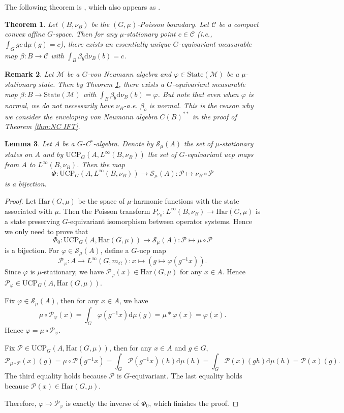 \documentclass[12pt]{amsart}
\newcommand{\cC}{{\mathcal C}}
\newcommand{\cM}{{\mathcal M}}
\newcommand{\cP}{{\mathcal P}}
\def\d{\mathrm{d}}
\newtheorem{thm}{Theorem}[section]
\newtheorem{lemma}[thm]{Lemma}
\newtheorem{remark}[thm]{Remark}
\theoremstyle{definition}
\begin{document}
The following theorem is \cite[Theorem 2.16]{BS06}, which also appears as \cite[Theorem 2.5]{boutonnet2021stationary}.
\begin{thm}\label{thm:boundary map}
Let $(B,\nu_B)$ be the $(G,\mu)$-Poisson boundary. Let $\cC$ be a compact convex affine $G$-space. Then for any $\mu$-stationary point $c\in\cC$ (i.e., $\int_G gc\,\d\mu(g)=c$), there exists an essentially unique $G$-equivariant measurable map $\beta:B\to \cC$ with $\int_B\beta_b\d\nu_B(b)=c$.
\end{thm}

\begin{remark}
Let $\cM$ be a $G$-von Neumann algebra and $\varphi\in \mathrm{State}(\cM)$ be a $\mu$-stationary state. Then by Theorem \ref{thm:boundary map}, there exists a $G$-equivariant measurable map $\beta:B\to \mathrm{State}(\cM)$ with $\int_B\beta_b\d\nu_B(b)=\varphi$. But note that even when $\varphi$ is normal, we do not necessarily have $\nu_B$-a.e. $\beta_b$ is normal. This is the reason why we consider the enveloping von Neumann algebra $C(B)^{**}$ in the proof of Theorem \ref{thm:NC IFT}.
\end{remark}

\begin{lemma}\label{lem:bijection stationary states and ucp maps}
Let $A$ be a $G$-C$^*$-algebra. Denote by $\mathcal{S}_\mu(A)$ the set of $\mu$-stationary states on $A$ and by $\mathrm{UCP}_G(A,L^\infty(B,\nu_B))$ the set of $G$-equivariant ucp maps from $A$ to $L^\infty(B,\nu_B)$. Then the map
$$\Phi:\mathrm{UCP}_G(A,L^\infty(B,\nu_B))\to\mathcal{S}_\mu(A):\cP\mapsto\nu_B\circ\cP$$
is a bijection.
\end{lemma}
\begin{proof}
Let $\mathrm{Har}(G,\mu)$ be the space of $\mu$-harmonic functions with the state associated with $\mu$. Then the Poisson transform $P_{\nu_B}:L^\infty(B,\nu_B)\to \mathrm{Har}(G,\mu)$ is a state preserving $G$-equivariant isomorphism between operator systems. Hence we only need to prove that
$$\Phi_0:\mathrm{UCP}_G(A,\mathrm{Har}(G,\mu))\to\mathcal{S}_\mu(A):\cP\mapsto\mu\circ\cP$$
is a bijection. For $\varphi\in\mathcal{S}_\mu(A)$, define a $G$-ucp map 
$$\cP_\varphi:A\to L^\infty(G,m_G):x\mapsto(g\mapsto \varphi(g^{-1}x)).$$
Since $\varphi$ is $\mu$-stationary, we have $\cP_\varphi(x)\in \mathrm{Har}(G,\mu)$ for any $x\in A$. Hence $\cP_\varphi\in\mathrm{UCP}_G(A,\mathrm{Har}(G,\mu))$. 

Fix $\varphi\in\mathcal{S}_\mu(A)$, then for any $x\in A$, we have
$$\mu\circ\cP_\varphi(x)=\int_G \varphi(g^{-1}x)\d\mu(g)=\mu\ast\varphi(x)=\varphi(x).$$
Hence $\varphi=\mu\circ\cP_\varphi$.

Fix $\cP\in\mathrm{UCP}_G(A,\mathrm{Har}(G,\mu))$, then for any $x\in A$ and $g\in G$,
$$\cP_{\mu\circ\cP}(x)(g)=\mu\circ\cP(g^{-1}x)=\int_G \cP(g^{-1}x)(h)\d\mu(h)=\int_G \cP(x)(gh)\d\mu(h)=\cP(x)(g).$$
The third equality holds because $\cP$ is $G$-equivariant. The last equality holds because $\cP(x)\in\mathrm{Har}(G,\mu)$.

Therefore, $\varphi\mapsto\cP_\varphi$ is exactly the inverse of $\Phi_0$, which finishes the proof.
\end{proof}
\end{document}
